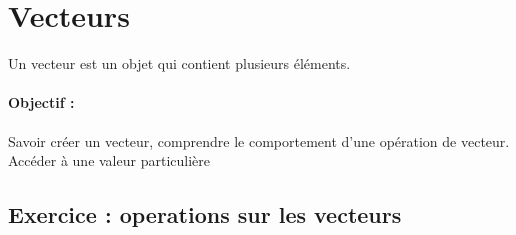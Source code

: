 \section{Vecteurs}
Un vecteur est un objet qui contient plusieurs éléments.
\paragraph{Objectif : }Savoir créer un vecteur,  comprendre le comportement d'une opération de vecteur. Accéder à une valeur particulière
\subsection{Exercice : operations sur les vecteurs}

